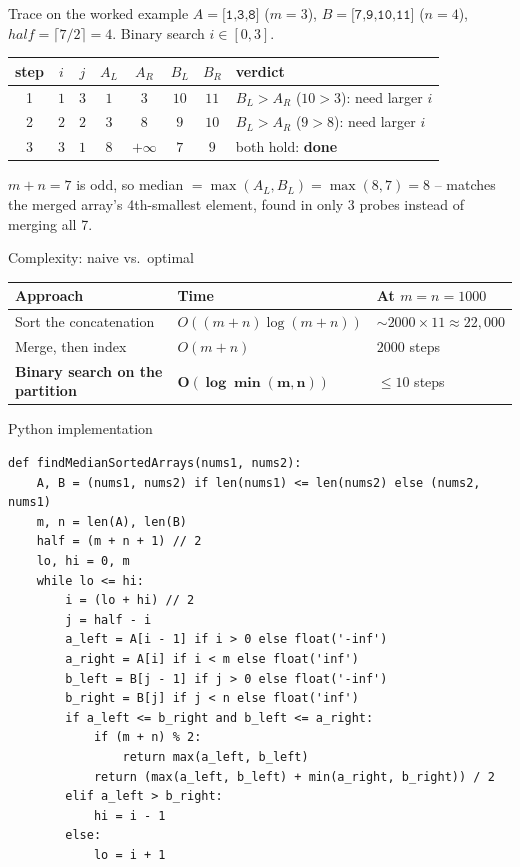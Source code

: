 \documentclass[11pt,aspectratio=169]{beamer}
\begin{document}
\begin{frame}{Trace on the worked example}
  \small
  $A=\texttt{[1,3,8]}$ ($m=3$), $B=\texttt{[7,9,10,11]}$ ($n=4$), $half = \lceil
  7/2\rceil = 4$. Binary search $i \in [0,3]$.
  \begin{center}
  \begin{tabular}{@{}cccccccl@{}}
    \toprule
    step & $i$ & $j$ & $A_L$ & $A_R$ & $B_L$ & $B_R$ & verdict \\
    \midrule
    1 & $1$ & $3$ & $1$ & $3$ & $10$ & $11$ & $B_L{>}A_R$ ($10{>}3$): need larger $i$ \\
    2 & $2$ & $2$ & $3$ & $8$ & $9$ & $10$ & $B_L{>}A_R$ ($9{>}8$): need larger $i$ \\
    3 & $3$ & $1$ & $8$ & $+\infty$ & $7$ & $9$ & both hold: \textbf{done} \\
    \bottomrule
  \end{tabular}
  \end{center}
  $m+n=7$ is odd, so median $=\max(A_L,B_L)=\max(8,7)=\boxed{8}$ -- matches the merged
  array's 4th-smallest element, found in only 3 probes instead of merging all 7.
\end{frame}

\begin{frame}{Complexity: naive vs.\ optimal}
  \begin{center}
  \begin{tabular}{@{}lll@{}}
    \toprule
    Approach & Time & At $m=n=1000$ \\
    \midrule
    Sort the concatenation & $O((m{+}n)\log(m{+}n))$ & $\sim 2000 \times 11 \approx 22{,}000$ \\
    Merge, then index & $O(m+n)$ & $2000$ steps \\
    \textbf{Binary search on the partition} & $\boldsymbol{O(\log\min(m,n))}$ &
    $\le 10$ steps \\
    \bottomrule
  \end{tabular}
  \end{center}
\end{frame}

\begin{frame}[fragile]{Python implementation}
  \begin{lstlisting}[style=py,aboveskip=0pt,belowskip=0pt]
def findMedianSortedArrays(nums1, nums2):
    A, B = (nums1, nums2) if len(nums1) <= len(nums2) else (nums2, nums1)
    m, n = len(A), len(B)
    half = (m + n + 1) // 2
    lo, hi = 0, m
    while lo <= hi:
        i = (lo + hi) // 2
        j = half - i
        a_left = A[i - 1] if i > 0 else float('-inf')
        a_right = A[i] if i < m else float('inf')
        b_left = B[j - 1] if j > 0 else float('-inf')
        b_right = B[j] if j < n else float('inf')
        if a_left <= b_right and b_left <= a_right:
            if (m + n) % 2:
                return max(a_left, b_left)
            return (max(a_left, b_left) + min(a_right, b_right)) / 2
        elif a_left > b_right:
            hi = i - 1
        else:
            lo = i + 1
  \end{lstlisting}
\end{frame}
\end{document}
